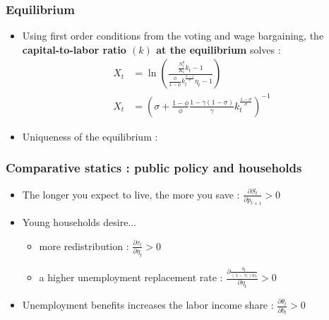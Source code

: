 \documentclass[usenames,dvipsnames]{beamer}
\begin{document}
	\begin{frame}[label = captolab]\frametitle{Equilibrium}
		\begin{itemize}
			\item Using first order conditions from the voting and wage bargaining, the \textbf{capital-to-labor ratio $(k)$ at the equilibrium} solves :
			\begin{align}
			X_t &= \ln\left( \frac{ \frac{N_t^y}{K_t} k_t - 1 } { \frac{\phi}{1-\phi} k_t^{\frac{\sigma-1}{\sigma}} \eta_t - 1 }\right) \label{eq:x1} \\
			X_t &= \left( \sigma + \frac{1-\phi}{\phi} \frac{1-\gamma(1-\sigma)}{\gamma} k_t^{\frac{1-\sigma}{\sigma}} \right)^{-1} \label{eq:x2}
			\end{align}
			\item Uniqueness of the equilibrium : \hyperlink{uniqueness<1>}{}
		\end{itemize}
	\end{frame}
	\begin{frame}\frametitle{Comparative statics : public policy and households}
		\begin{itemize}
			\item The longer you expect to live, the more you save : $\frac{\partial S_t}{\partial p_{t+1}} > 0$
			\vspace{1em}
			\item Young households desire...
			\begin{itemize}
				\item more redistribution : $\frac{\partial \tau_t}{\partial \eta_t} > 0$
				\item a higher unemployment replacement rate : $\frac{\partial \frac{b_t}{(1-\tau_t)w_t}}{\partial \eta_t}>0$
			\end{itemize}
			\vspace{1em}
			\item Unemployment benefits increases the labor income share : $\frac{\partial \theta_t}{\partial b_t} > 0$
		\end{itemize}
	\end{frame}
\end{document}
